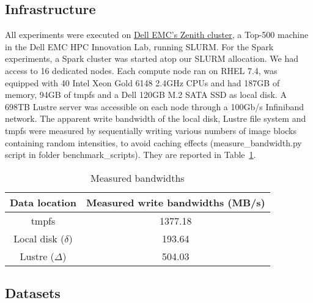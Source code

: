 \documentclass{IEEEtran}
\begin{document}
\subsection{Infrastructure} %

 All experiments were executed on  
 \href{https://www.dellemc.com/resources/en-us/asset/sales-documents/products/storage/h16221-hpc-lab-brochure.pdf}{Dell EMC's Zenith 
 cluster}, a Top-500 machine in the Dell EMC HPC Innovation Lab, running 
 SLURM. For the Spark experiments, a Spark cluster was started atop our 
 SLURM allocation. We had access to 16 dedicated nodes. Each compute 
 node ran on RHEL 7.4, was 
equipped with 40 Intel Xeon Gold 6148 2.4GHz CPUs and had
187GB of memory, 94GB of tmpfs and a Dell 120GB M.2 SATA SSD as local disk. 
A 698TB Lustre server was accessible on each node through a 100Gb/s 
Infiniband network. The apparent write bandwidth of the local disk, 
Lustre file system and tmpfs were measured by sequentially writing various numbers
of image blocks containing random intensities, to avoid 
caching effects (measure\_bandwidth.py script in folder 
benchmark\_scripts). They are reported in Table~\ref{table:bdwdths}.

\begin{table}
\centering
\begin{tabular}{c|c}
\rowcolor{headcolor}
Data location & Measured write bandwidths (MB/s)\\
\hline
tmpfs                 & 1377.18 \\
Local disk ($\delta$) & 193.64  \\
Lustre   ($\Delta$)   & 504.03 \\
\end{tabular}
\caption{Measured bandwidths}
\label{table:bdwdths}
\end{table}




\subsection{Datasets} %
\end{document}
